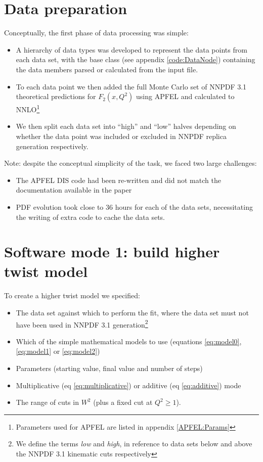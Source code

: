 \documentclass[12pt,a4paper]{report}
\newcommand*{\lr}[1]{\left( {#1} \right)}
\begin{document}
\section{Data preparation}

Conceptually, the first phase of data processing was simple:
\begin{itemize}
\item A hierarchy of data types was developed to represent the data points from each data set, with the base class (see appendix \ref{code:DataNode}) containing the data members parsed or calculated from the input file.
\item To each data point we then added the full Monte Carlo set of NNPDF 3.1 theoretical predictions for $F_2 \lr{x, Q^2}$ using APFEL \cite{APFEL} and calculated to NNLO\footnote{Parameters used for APFEL are listed in appendix \ref{APFEL:Params}}
\item We then split each data set into ``high'' and ``low'' halves depending on whether the data point was included or excluded in NNPDF replica generation respectively.
\end{itemize}

Note: despite the conceptual simplicity of the task, we faced two large challenges:
\begin{itemize}
\item The APFEL DIS code had been re-written and did not match the documentation available in the paper \cite{APFEL}
\item PDF evolution took close to 36 hours for each of the data sets, necessitating the writing of extra code to cache the data sets.
\end{itemize}



\section{Software mode 1: build higher twist model} \label{sec:design_model_build}

To create a higher twist model we specified:
\begin{itemize}
\item The data set against which to perform the fit, where the data set must not have been used in NNPDF 3.1 generation\footnote{We define the terms \emph{low} and \emph{high}, in reference to data sets below and above the NNPDF 3.1 kinematic cuts respectively}
\item Which of the simple mathematical models to use (equations \ref{eq:model0}, \ref{eq:model1} or \ref{eq:model2})
\item Parameters (starting value, final value and number of steps)
\item Multiplicative (eq \ref{eq:multiplicative}) or additive (eq \ref{eq:additive}) mode
\item The range of cuts in $W^2$ (plus a fixed cut at $Q^2 \ge 1$).
\end{itemize}
\end{document}
